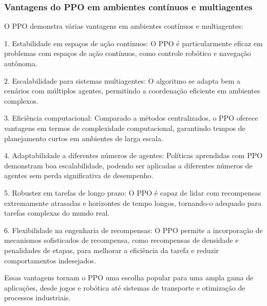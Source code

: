\subsubsection{Vantagens do PPO em ambientes contínuos e multiagentes}
\label{subsubsec:ppo_vantagens}

O PPO demonstra várias vantagens em ambientes contínuos e multiagentes:

1. Estabilidade em espaços de ação contínuos: O PPO é particularmente eficaz em problemas com espaços de ação contínuos, como controle robótico e navegação autônoma\cite{https://arxiv.org/abs/2404.02577,https://arxiv.org/abs/1710.04423}.

2. Escalabilidade para sistemas multiagentes: O algoritmo se adapta bem a cenários com múltiplos agentes, permitindo a coordenação eficiente em ambientes complexos\cite{https://www.semanticscholar.org/paper/bb51dbfb79919e392709be5c7b8f8119fe3f9420}.

3. Eficiência computacional: Comparado a métodos centralizados, o PPO oferece vantagens em termos de complexidade computacional, garantindo tempos de planejamento curtos em ambientes de larga escala\cite{https://www.semanticscholar.org/paper/133b58d42562ce16d99fad0e59d3edeff515821c}.

4. Adaptabilidade a diferentes números de agentes: Políticas aprendidas com PPO demonstram boa escalabilidade, podendo ser aplicadas a diferentes números de agentes sem perda significativa de desempenho\cite{https://www.semanticscholar.org/paper/bb51dbfb79919e392709be5c7b8f8119fe3f9420}.

5. Robustez em tarefas de longo prazo: O PPO é capaz de lidar com recompensas extremamente atrasadas e horizontes de tempo longos, tornando-o adequado para tarefas complexas do mundo real\cite{https://arxiv.org/abs/2404.02577}.

6. Flexibilidade na engenharia de recompensas: O PPO permite a incorporação de mecanismos sofisticados de recompensa, como recompensas de densidade e penalidades de etapas, para melhorar a eficiência da tarefa e reduzir comportamentos indesejados\cite{https://www.semanticscholar.org/paper/133b58d42562ce16d99fad0e59d3edeff515821c}.

Essas vantagens tornam o PPO uma escolha popular para uma ampla gama de aplicações, desde jogos e robótica até sistemas de transporte e otimização de processos industriais\cite{https://arxiv.org/abs/2404.02577,https://www.semanticscholar.org/paper/c70691776f1c755a5f7c00dbf8929e2b61a0a240,https://www.semanticscholar.org/paper/bb51dbfb79919e392709be5c7b8f8119fe3f9420}.

